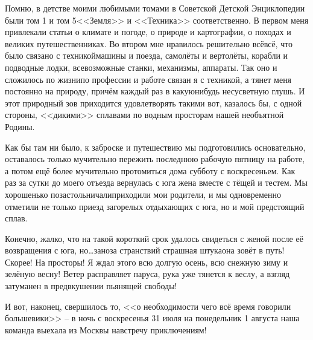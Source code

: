 Помню, в детстве моими любимыми томами в Советской Детской Энциклопедии были том 1 и том 5\mdash <<Земля>> и <<Техника>> соответственно. В первом меня привлекали статьи о климате и погоде, о природе и картографии, о походах и великих путешественниках. Во втором мне нравилось решительно всё\mdash всё, что было связано с техникой\mdash машины и поезда, самолёты и вертолёты, корабли и подводные лодки, всевозможные станки, механизмы, аппараты. Так оно и сложилось по жизни\mdash по профессии и работе связан я с техникой, а тянет меня постоянно на природу, причём каждый раз в какую\sdash нибудь несусветную глушь. И этот природный зов приходится удовлетворять такими вот, казалось бы, с одной стороны, <<дикими>> сплавами по водным просторам нашей необъятной Родины.

Как бы там ни было, к заброске и путешествию мы подготовились основательно, оставалось  только мучительно пережить последнюю рабочую пятницу на работе, а потом ещё более мучительно протомиться дома субботу с воскресеньем. Как раз за сутки до моего отъезда вернулась с юга жена вместе с тёщей и тестем. Мы хорошенько позастольничали\mdash приходили мои родители, и мы одновременно отметили не только приезд загорелых отдыхающих с юга, но и мой предстоящий сплав. 

Конечно, жалко, что на такой короткий срок удалось свидеться с женой после её возвращения с юга, но\ldots заноза странствий страшная штука\mdash она зовёт в путь! Скорее! На просторы! Я ждал этого всю долгую осень, всю снежную зиму и зелёную весну! Ветер расправляет паруса, рука уже тянется к веслу, а взгляд затуманен в предвкушении пьянящей свободы!

И вот, наконец, свершилось то, <<о необходимости чего всё время говорили большевики>> – в ночь с воскресенья 31 июля на понедельник 1 августа наша команда выехала из Москвы навстречу приключениям!

\begin{center}
\end{center}
